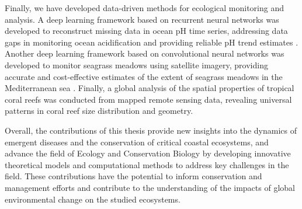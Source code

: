 
Finally, we have developed data-driven methods for
ecological monitoring and analysis. A deep learning framework based on
recurrent neural networks was developed to reconstruct missing data in ocean
pH time series, addressing data gaps in monitoring ocean acidification and
providing reliable pH trend estimates \cite{Flecha2022}. Another deep learning
framework based on convolutional neural networks was developed to monitor
seagrass meadows using satellite imagery, providing accurate and cost-effective
estimates of the extent of seagrass meadows in the Mediterranean sea
\cite{GimenezRomero2024_posi}. Finally, a global analysis of the spatial
properties of tropical coral reefs was conducted from mapped remote sensing
data, revealing universal patterns in coral reef size distribution and
geometry.

Overall, the contributions of this thesis provide new insights into the
dynamics of emergent diseases and the conservation of critical coastal
ecosystems, and advance the field of Ecology and Conservation Biology by
developing innovative theoretical models and computational methods to address
key challenges in the field. These contributions have the potential to inform
conservation and management efforts and contribute to the understanding of the
impacts of global environmental change on the studied ecosystems.



